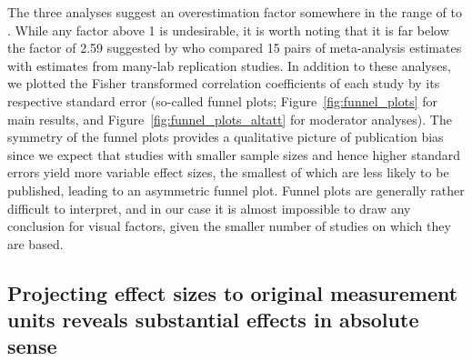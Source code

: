 
The three analyses suggest an overestimation factor somewhere in the range of  to \unskip. While any factor above 1 is undesirable, it is worth noting that it is far below the factor of 2.59 suggested by \cite{kvarven2020} who compared 15 pairs of meta-analysis estimates with estimates from many-lab replication studies. In addition to these analyses, we plotted the Fisher transformed correlation coefficients of each study by its respective standard error (so-called funnel plots; Figure~\ref{fig:funnel_plots} for main results, and Figure~\ref{fig:funnel_plots_altatt} for moderator analyses). The symmetry of the funnel plots provides a qualitative picture of publication bias since we expect that studies with smaller sample sizes and hence higher standard errors yield more variable effect sizes, the smallest of which are less likely to be published, leading to an asymmetric funnel plot. Funnel plots are generally rather difficult to interpret, and in our case it is almost impossible to draw any conclusion for visual factors, given the smaller number of studies on which they are based.




\subsection{Projecting effect sizes to original measurement units reveals substantial effects in absolute sense}

